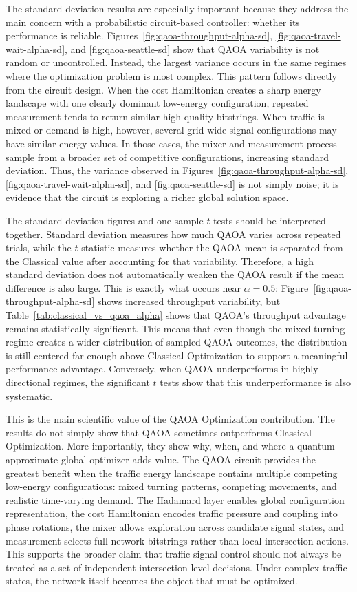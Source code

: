 \documentclass[12pt]{article}
\begin{document}
The standard deviation results are especially important because they address the main concern with a probabilistic circuit-based controller: whether its performance is reliable. Figures~\ref{fig:qaoa-throughput-alpha-sd}, \ref{fig:qaoa-travel-wait-alpha-sd}, and \ref{fig:qaoa-seattle-sd} show that QAOA variability is not random or uncontrolled. Instead, the largest variance occurs in the same regimes where the optimization problem is most complex. This pattern follows directly from the circuit design. When the cost Hamiltonian creates a sharp energy landscape with one clearly dominant low-energy configuration, repeated measurement tends to return similar high-quality bitstrings. When traffic is mixed or demand is high, however, several grid-wide signal configurations may have similar energy values. In those cases, the mixer and measurement process sample from a broader set of competitive configurations, increasing standard deviation. Thus, the variance observed in Figures~\ref{fig:qaoa-throughput-alpha-sd}, \ref{fig:qaoa-travel-wait-alpha-sd}, and \ref{fig:qaoa-seattle-sd} is not simply noise; it is evidence that the circuit is exploring a richer global solution space.

The standard deviation figures and one-sample $t$-tests should be interpreted together. Standard deviation measures how much QAOA varies across repeated trials, while the $t$ statistic measures whether the QAOA mean is separated from the Classical value after accounting for that variability. Therefore, a high standard deviation does not automatically weaken the QAOA result if the mean difference is also large. This is exactly what occurs near $\alpha=0.5$: Figure~\ref{fig:qaoa-throughput-alpha-sd} shows increased throughput variability, but Table~\ref{tab:classical_vs_qaoa_alpha} shows that QAOA's throughput advantage remains statistically significant. This means that even though the mixed-turning regime creates a wider distribution of sampled QAOA outcomes, the distribution is still centered far enough above Classical Optimization to support a meaningful performance advantage. Conversely, when QAOA underperforms in highly directional regimes, the significant $t$ tests show that this underperformance is also systematic.

This is the main scientific value of the QAOA Optimization contribution. The results do not simply show that QAOA sometimes outperforms Classical Optimization. More importantly, they show why, when, and where a quantum approximate global optimizer adds value. The QAOA circuit provides the greatest benefit when the traffic energy landscape contains multiple competing low-energy configurations: mixed turning patterns, competing movements, and realistic time-varying demand. The Hadamard layer enables global configuration representation, the cost Hamiltonian encodes traffic pressure and coupling into phase rotations, the mixer allows exploration across candidate signal states, and measurement selects full-network bitstrings rather than local intersection actions. This supports the broader claim that traffic signal control should not always be treated as a set of independent intersection-level decisions. Under complex traffic states, the network itself becomes the object that must be optimized.
\end{document}
